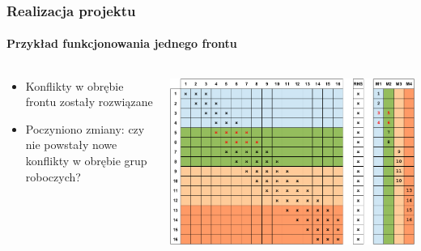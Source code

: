 \documentclass[12pt,handout]{beamer}
\begin{document}
\begin{frame}
\frametitle{Realizacja projektu}
\framesubtitle{Przykład funkcjonowania jednego frontu}
\begin{columns}[t] %
     \begin{column}[T]{5cm} %
     \begin{itemize}
		\item Konflikty w obrębie frontu zostały rozwiązane
		\item Poczyniono zmiany: czy nie powstały nowe konflikty w obrębie grup roboczych?
     \end{itemize}
     \end{column}
     \begin{column}[T]{7cm} %
		\includegraphics[scale=0.3]{frame2.jpg}
     \end{column}
     \end{columns}
\end{frame}
\end{document}
